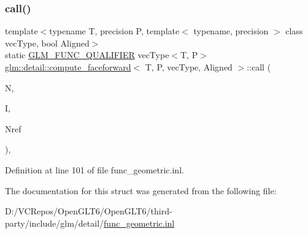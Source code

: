 \subsubsection{\texorpdfstring{call()}{call()}}
{\footnotesize\ttfamily template$<$typename T, precision P, template$<$ typename, precision $>$ class vec\+Type, bool Aligned$>$ \\
static \mbox{\hyperlink{setup_8hpp_a33fdea6f91c5f834105f7415e2a64407}{G\+L\+M\+\_\+\+F\+U\+N\+C\+\_\+\+Q\+U\+A\+L\+I\+F\+I\+ER}} vec\+Type$<$T, P$>$ \mbox{\hyperlink{structglm_1_1detail_1_1compute__faceforward}{glm\+::detail\+::compute\+\_\+faceforward}}$<$ T, P, vec\+Type, Aligned $>$\+::call (\begin{DoxyParamCaption}\item[{vec\+Type$<$ T, P $>$ const \&}]{N,  }\item[{vec\+Type$<$ T, P $>$ const \&}]{I,  }\item[{vec\+Type$<$ T, P $>$ const \&}]{Nref }\end{DoxyParamCaption})\hspace{0.3cm}{\ttfamily [inline]}, {\ttfamily [static]}}



Definition at line 101 of file func\+\_\+geometric.\+inl.



The documentation for this struct was generated from the following file\+:\begin{DoxyCompactItemize}
\item 
D\+:/\+V\+C\+Repos/\+Open\+G\+L\+T6/\+Open\+G\+L\+T6/third-\/party/include/glm/detail/\mbox{\hyperlink{func__geometric_8inl}{func\+\_\+geometric.\+inl}}\end{DoxyCompactItemize}
